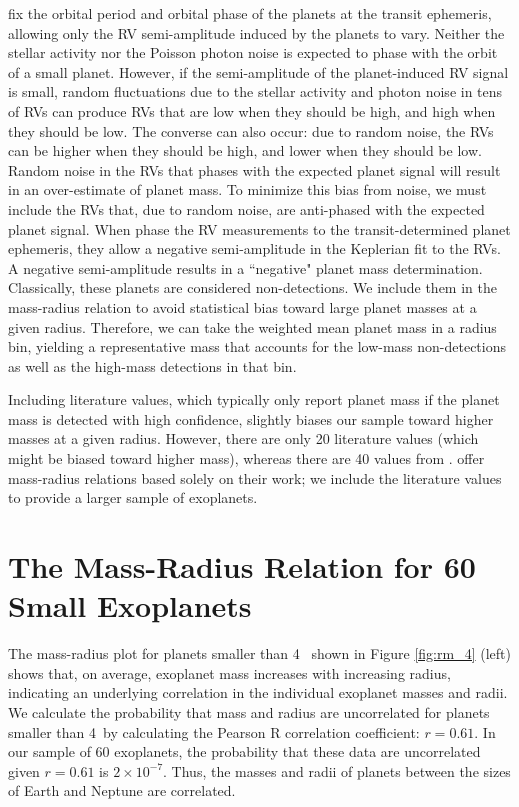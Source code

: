 \documentclass[iop]{emulateapj}
\begin{document}
\citet{Marcy2013} fix the orbital period and orbital phase of the planets at the transit ephemeris, allowing only the RV semi-amplitude induced by the planets to vary.  Neither the stellar activity nor the Poisson photon noise is expected to phase with the orbit of a small planet.  However, if the semi-amplitude of the planet-induced RV signal is small, random fluctuations due to the stellar activity and photon noise in tens of RVs can produce RVs that are low when they should be high, and high when they should be low.  The converse can also occur: due to random noise, the RVs can be higher when they should be high, and lower when they should be low.  Random noise in the RVs that phases with the expected planet signal will result in an over-estimate of planet mass.  To minimize this bias from noise, we must include the RVs that, due to random noise, are anti-phased with the expected planet signal.  When \citet{Marcy2013} phase the RV measurements to the transit-determined planet ephemeris, they allow  a negative semi-amplitude in the Keplerian fit to the RVs.  A negative semi-amplitude results in a ``negative" planet mass determination.  Classically, these planets are considered non-detections.  We include them in the mass-radius relation to avoid statistical bias toward large planet masses at a given radius.  Therefore, we can take the weighted mean planet mass in a radius bin, yielding a representative mass that accounts for the low-mass non-detections as well as the high-mass detections in that bin.

Including literature values, which typically only report planet mass if the planet mass is detected with high confidence, slightly biases our sample toward higher masses at a given radius.  However, there are only 20 literature values (which might be biased toward higher mass), whereas there are 40 values from \citet{Marcy2013}.  
\citet{Marcy2013} offer mass-radius relations based solely on their work; we include the literature values to provide a larger sample of exoplanets.


\section{The Mass-Radius Relation for 60 Small Exoplanets}
The mass-radius plot for planets smaller than 4 \rearth\ shown in Figure \ref{fig:rm_4} (left) shows that, on average, exoplanet mass increases with increasing radius, indicating an underlying correlation in the individual exoplanet masses and radii.  We calculate the probability that mass and radius are uncorrelated for planets smaller than 4\rearth\ by calculating the Pearson R correlation coefficient: $r=0.61$.  In our sample of 60 exoplanets, the probability that these data are uncorrelated given $r = 0.61$ is $2 \times 10^{-7}$.  Thus, the masses and radii of planets between the sizes of Earth and Neptune are correlated.
\end{document}
